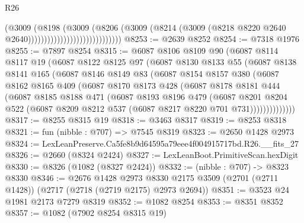 \begin{lexlean}{R26}
\begin{coremodule}
                                              (@3009
                                                (@8198
                                                  (@3009
                                                    (@8206
                                                      (@3009
                                                        (@8214
                                                          (@3009
                                                            (@8218
                                                              @8220
                                                              @2640
                                                              @2640)))))))))))))))))))))))))))))
@8253 := @2639 @8252
@8254 := @7318 @1976
@8255 := @7897 @8254
@8315 := @6087
    @8106
    @8109
    @90
    (@6087
      @8114
      @8117
      @19
      (@6087
        @8122
        @8125
        @97
        (@6087
          @8130
          @8133
          @55
          (@6087
            @8138
            @8141
            @165
            (@6087
              @8146
              @8149
              @83
              (@6087
                @8154
                @8157
                @380
                (@6087
                  @8162
                  @8165
                  @409
                  (@6087
                    @8170
                    @8173
                    @428
                    (@6087
                      @8178
                      @8181
                      @444
                      (@6087
                        @8185
                        @8188
                        @471
                        (@6087
                          @8193
                          @8196
                          @479
                          (@6087
                            @8201
                            @8204
                            @522
                            (@6087 @8209 @8212 @537 (@6087 @8217 @8220 @701 @731))))))))))))))
@8317 := @8255 @8315 @19
@8318 := @3463 @8317
@8319 := @8253 @8318
@8321 := fun (nibble : @707) => @7545 @8319
@8323 := @2650 @1428 @2973
@8324 := LexLeanPreserve.Ca5fe8b9d64595a79eee4f004915717bd.R26.__fits_27
@8326 := @2660 (@8324 @2424)
@8327 := LexLeanBoot.PrimitiveScan.hexDigit
@8330 := @8326 (@1082 (@8327 @2424))
@8332 := (nibble : @707) -> @8323 @8330
@8346 := @2676
    @1428
    @2973
    @8330
    @2175
    @3509
    (@2701 (@2711 @1428))
    (@2717 (@2718 (@2719 @2175) @2973 @2694))
@8351 := @3523 @24 @1981 @2173 @7279 @8319
@8352 := @1082 @8254
@8353 := @8351 @8352
@8357 := @1082 (@7902 @8254 @8315 @19)

\end{coremodule}
\end{lexlean}
